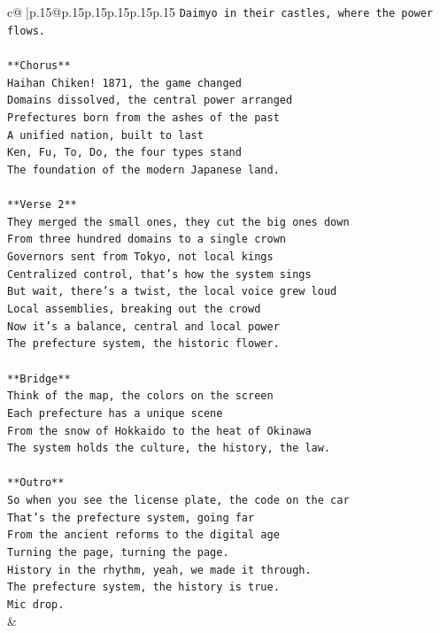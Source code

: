 \documentclass{article}
\begin{document}
{\begin{supertabular}{c@{$\;$}|p{.15\linewidth}@{}p{.15\linewidth}p{.15\linewidth}p{.15\linewidth}p{.15\linewidth}p{.15\linewidth}}
{{{\texttt{Daimyo in their castles, where the power flows.} \\
\\ 
\texttt{**Chorus**} \\
\texttt{Haihan Chiken! 1871, the game changed} \\
\texttt{Domains dissolved, the central power arranged} \\
\texttt{Prefectures born from the ashes of the past} \\
\texttt{A unified nation, built to last} \\
\texttt{Ken, Fu, To, Do, the four types stand} \\
\texttt{The foundation of the modern Japanese land.} \\
\\ 
\texttt{**Verse 2**} \\
\texttt{They merged the small ones, they cut the big ones down} \\
\texttt{From three hundred domains to a single crown} \\
\texttt{Governors sent from Tokyo, not local kings} \\
\texttt{Centralized control, that's how the system sings} \\
\texttt{But wait, there's a twist, the local voice grew loud} \\
\texttt{Local assemblies, breaking out the crowd} \\
\texttt{Now it's a balance, central and local power} \\
\texttt{The prefecture system, the historic flower.} \\
\\ 
\texttt{**Bridge**} \\
\texttt{Think of the map, the colors on the screen} \\
\texttt{Each prefecture has a unique scene} \\
\texttt{From the snow of Hokkaido to the heat of Okinawa} \\
\texttt{The system holds the culture, the history, the law.} \\
\\ 
\texttt{**Outro**} \\
\texttt{So when you see the license plate, the code on the car} \\
\texttt{That's the prefecture system, going far} \\
\texttt{From the ancient reforms to the digital age} \\
\texttt{Turning the page, turning the page.} \\
\texttt{History in the rhythm, yeah, we made it through.} \\
\texttt{The prefecture system, the history is true.} \\
\texttt{Mic drop.} \\
            }
        }
    }
    & \\ \\


\end{supertabular}}
\end{document}
